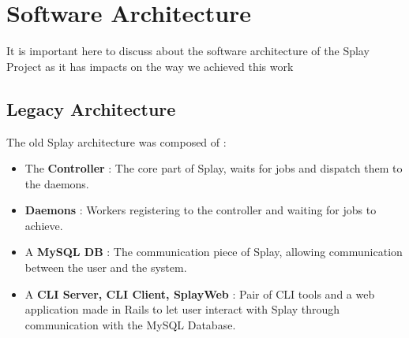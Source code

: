 \documentclass{eplmastersthesis}
\begin{document}
    \section{Software Architecture}

      It is important here to discuss about the software architecture of the
      Splay Project as it has impacts on the way we achieved this work

      \subsection{Legacy Architecture}

        The old Splay architecture was composed of :

        \begin{itemize}
          \item The \textbf{Controller} : The core part of Splay, waits for jobs
          and dispatch them to the daemons.
          \item \textbf{Daemons} : Workers registering to the controller and waiting
          for jobs to achieve.
          \item A \textbf{MySQL DB} : The communication piece of Splay, allowing
          communication between the user and the system.
          \item A \textbf{CLI Server, CLI Client, SplayWeb} : Pair of CLI tools
          and a web application made in Rails to let user interact with
          Splay through communication with the MySQL Database.
        \end{itemize}
\end{document}
